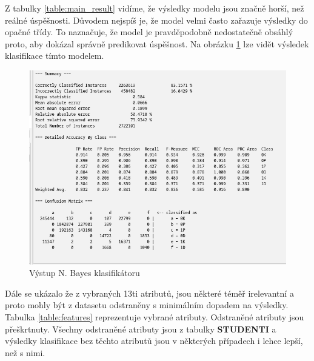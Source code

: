 \documentclass[12pt, letterpaper]{article}
\begin{document}
Z tabulky \ref{table:main_result} vidíme, že výsledky modelu jsou značně horší, než reálné úspěšnosti. Důvodem nejspíš
je, že model velmi často zařazuje výsledky do opačné třídy. To naznačuje, že model je pravděpodobně nedostatečně 
obsáhlý proto, aby dokázal správně predikovat úspěšnost. Na obrázku \ref{fig:bayes_results} lze vidět výsledek klasifikace tímto modelem.
\begin{figure}[H]
    \centering
    \includegraphics[width=\linewidth]{img/results_bayes.png}
    \caption{Výstup N. Bayes klasifikátoru}
    \label{fig:bayes_results}
\end{figure}
Dále se ukázalo že z vybraných 13ti atributů, jsou některé téměř irelevantní a proto mohly být z datasetu odstraněny s
minimálním dopadem na výsledky. Tabulka \ref{table:features} reprezentuje vybrané atributy. Odstraněné atributy jsou 
přeškrtnuty. Všechny odstraněné atributy jsou z tabulky \textbf{STUDENTI} a výsledky klasifikace bez těchto atributů
jsou v některých případech i lehce lepší, než s nimi.
\end{document}
